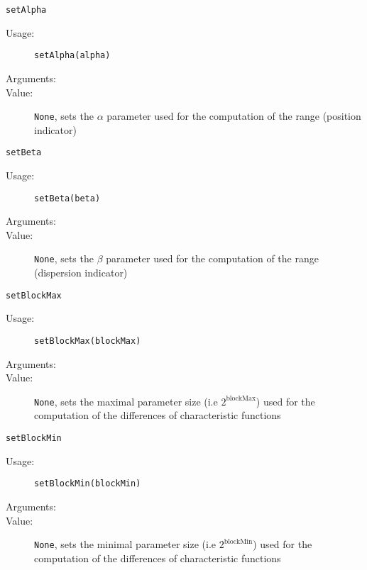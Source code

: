 \begin{description}
\begin{description}
  \item \texttt{setAlpha}
    \begin{description}
    \item[Usage:]  \texttt{setAlpha(alpha)}
    \item[Arguments:]  \strut
    \item[Value:]  \texttt{None}, sets the $\alpha$ parameter used for the computation of the range (position indicator)
    \end{description}

  \item \texttt{setBeta}
    \begin{description}
    \item[Usage:] \texttt{setBeta(beta)}
    \item[Arguments:] \strut
    \item[Value:] \texttt{None}, sets the $\beta$ parameter used for the computation of the range (dispersion indicator)
    \end{description}

  \item \texttt{setBlockMax}
    \begin{description}
    \item[Usage:]  \texttt{setBlockMax(blockMax)}
    \item[Arguments:]  \strut
    \item[Value:] \texttt{None}, sets the maximal parameter size (i.e $2^{\text{blockMax}}$) used for the computation of the differences of characteristic functions
    \end{description}

  \item \texttt{setBlockMin}
    \begin{description}
    \item[Usage:]  \texttt{setBlockMin(blockMin)}
    \item[Arguments:]  \strut
    \item[Value:] \texttt{None}, sets the minimal parameter size (i.e $2^{\text{blockMin}}$) used for the computation of the differences of characteristic functions
    \end{description}


\end{description}
\end{description}
